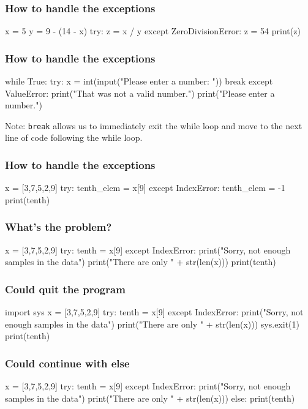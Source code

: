 \documentclass{beamer}
\begin{document}
\begin{frame}[fragile]
\frametitle{How to handle the exceptions}
\begin{code}
x = 5
y = 9 - (14 - x)
try:
   z = x / y
except ZeroDivisionError:
   z = 54
print(z)
\end{code}
\end{frame}

\begin{frame}[fragile]
\frametitle{How to handle the exceptions}

\begin{code}
while True:
   try:
      x = int(input("Please enter a number: "))
      break
   except ValueError:
      print("That was not a valid number.")
      print("Please enter a number.")
\end{code}

\bigskip

Note: \texttt{break} allows us to immediately exit the while loop and move
to the next line of code following the while loop.
\end{frame}

\begin{frame}[fragile]
\frametitle{How to handle the exceptions}
\begin{code}
x = [3,7,5,2,9]
try:
   tenth_elem = x[9]
except IndexError:
   tenth_elem = -1
print(tenth)
\end{code}
\end{frame}

\begin{frame}[fragile]
\frametitle{What's the problem?}
\begin{code}
x = [3,7,5,2,9]
try:
   tenth = x[9]
except IndexError:
   print("Sorry, not enough samples in the data")
   print("There are only " + str(len(x)))
print(tenth)
\end{code}
\end{frame}

\begin{frame}[fragile]
\frametitle{Could quit the program}
\begin{code}
import sys
x = [3,7,5,2,9]
try:
   tenth = x[9]
except IndexError:
   print("Sorry, not enough samples in the data")
   print("There are only " + str(len(x)))
   sys.exit(1)
print(tenth)
\end{code}
\end{frame}

\begin{frame}[fragile]
\frametitle{Could continue with else}
\begin{code}
x = [3,7,5,2,9]
try:
   tenth = x[9]
except IndexError:
   print("Sorry, not enough samples in the data")
   print("There are only " + str(len(x)))
else:
   print(tenth)
\end{code}
\end{frame}
\end{document}
